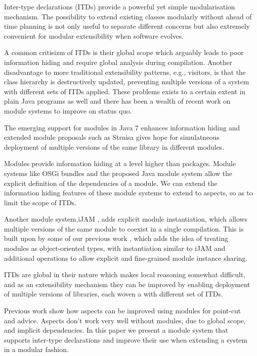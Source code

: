 
Inter-type declarations (ITDs) provide a powerful yet simple modularisation
mechanism. The possibility to extend existing classes modularly without
ahead of time planning is not only useful to separate different concerns
but also extremely convenient for modular extensibility when software
evolves.

A common critisizm of ITDs is their global scope which arguably leads to
poor information hiding and require global analysis during compilation.
Another disadvantage to more traditional extensibility patterns, e.g.,
visitors, is that the class hierarchy is destructively updated, preventing
multiple versions of a system with different sets of ITDs applied.
These problems exists to a certain extent in plain Java programs as well
and there has been a wealth of recent work on module systems to improve on
status quo. 

The emerging support for modules in Java 7 enhances information hiding and
extended module proposals such as Strnisa gives hope for simulatneous
deployment of multiple versions of the same library in different modules.

Modules provide information hiding at a level higher than packages. Module
systems like OSGi bundles\cite{OSGi4} and the proposed Java module system\cite{JSR277}
allow the explicit definition of the dependencies of a module. We can extend
the information hiding features of these module systems to extend to aspects, 
so as to limit the scope of ITDs.

Another module system,iJAM \cite{iJAM}, adds explicit module instantiation, 
which allows multiple versions of the same module to coexist in a single compilation.
This is built upon by some of our previous work \cite{modulesastypes}, which 
adds the idea of treating modules as object-oriented types, with instantiation
similar to iJAM and additional operations to allow explicit and fine-grained
module instance sharing. 

ITDs are global in their nature which makes local
reasoning somewhat difficult, and as an extensibility mechanism they can be
improved by enabling deployment of multiple versions of libraries, 
each woven a with different set of ITDs.


Previous work show how aspects can be improved using modules for point-cut
and advice.
Aspects don't work very well without modules, due to global scope, and
implicit dependencies.
In this paper we present a module system that supports inter-type
declarations and improve their use when extending a system in a modular
fashion.

